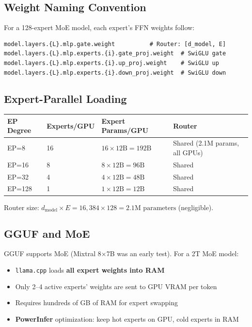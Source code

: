 \documentclass[11pt,a4paper]{article}
\begin{document}
\subsection{Weight Naming Convention}

For a 128-expert MoE model, each expert's FFN weights follow:

\begin{lstlisting}[basicstyle=\ttfamily\small]
model.layers.{L}.mlp.gate.weight          # Router: [d_model, E]
model.layers.{L}.mlp.experts.{i}.gate_proj.weight  # SwiGLU gate
model.layers.{L}.mlp.experts.{i}.up_proj.weight    # SwiGLU up
model.layers.{L}.mlp.experts.{i}.down_proj.weight  # SwiGLU down
\end{lstlisting}

\subsection{Expert-Parallel Loading}

\begin{center}
\begin{tabular}{llll}
\toprule
\textbf{EP Degree} & \textbf{Experts/GPU} & \textbf{Expert Params/GPU} & \textbf{Router} \\
\midrule
EP=8 & 16 & $16 \times 12\text{B} = 192\text{B}$ & Shared (2.1M params, all GPUs) \\
EP=16 & 8 & $8 \times 12\text{B} = 96\text{B}$ & Shared \\
EP=32 & 4 & $4 \times 12\text{B} = 48\text{B}$ & Shared \\
EP=128 & 1 & $1 \times 12\text{B} = 12\text{B}$ & Shared \\
\bottomrule
\end{tabular}
\end{center}

Router size: $d_{\text{model}} \times E = 16{,}384 \times 128 = 2.1\text{M parameters}$ (negligible).

\subsection{GGUF and MoE}

GGUF supports MoE (Mixtral 8$\times$7B was an early test). For a 2T MoE model:

\begin{itemize}[itemsep=1pt]
  \item \texttt{llama.cpp} loads \textbf{all expert weights into RAM}
  \item Only 2--4 active experts' weights are sent to GPU VRAM per token
  \item Requires hundreds of GB of RAM for expert swapping
  \item \textbf{PowerInfer} optimization: keep hot experts on GPU, cold experts in RAM
\end{itemize}
\end{document}
